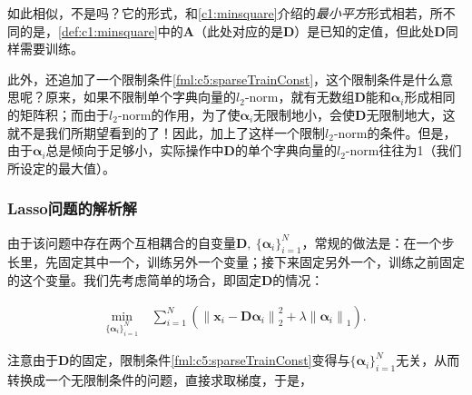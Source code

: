 如此相似，不是吗？它的形式，和\autoref{c1:minsquare}介绍的\emph{最小平方}形式相若，所不同的是，\autoref{def:c1:minsquare}中的$\mathbf{A}$（此处对应的是$\mathbf{D}$）是已知的定值，但此处$\mathbf{D}$同样需要训练。

此外，还追加了一个限制条件\eqref{fml:c5:sparseTrainConst}，这个限制条件是什么意思呢？原来，如果不限制单个字典向量的$l_2$-norm，就有无数组$\mathbf{D}$能和$\bm{\alpha}_i$形成相同的矩阵积；而由于$l_2$-norm的作用，为了使$\bm{\alpha}_i$无限制地小，会使$\mathbf{D}$无限制地大，这就不是我们所期望看到的了！因此，加上了这样一个限制$l_2$-norm的条件。但是，由于$\bm{\alpha}_i$总是倾向于足够小，实际操作中$\mathbf{D}$的单个字典向量的$l_2$-norm往往为1（我们所设定的最大值）。

\subsubsection{Lasso问题的解析解}
\label{c5:Lasso}
由于该问题中存在两个互相耦合的自变量$\mathbf{D},~{\{\bm{\alpha}_i\}}_{i=1}^{N}$，常规的做法是：在一个步长里，先固定其中一个，训练另外一个变量；接下来固定另外一个，训练之前固定的这个变量。我们先考虑简单的场合，即固定$\mathbf{D}$的情况：

\begin{problem}[Lasso问题] \label{def:c5:Lasso}
	\begin{subequations}
		\renewcommand{\theequation}
		{\theparentequation-\arabic{equation}}
		\begin{align}
			\min\limits_{{\{\bm{\alpha}_i\}}_{i=1}^{N}}~&{\sum_{i=1}^{N} \left({\lVert \mathbf{x}_i - \mathbf{D}\bm{\alpha}_i \rVert}_2^2 + \lambda {\lVert \bm{\alpha}_i \rVert}_1 \right)}. \label{fml:c5:Lasso}
		\end{align}
	\end{subequations}
\end{problem}

注意由于$\mathbf{D}$的固定，限制条件\eqref{fml:c5:sparseTrainConst}变得与${\{\bm{\alpha}_i\}}_{i=1}^{N}$无关，从而转换成一个无限制条件的问题，直接求取梯度，于是，


